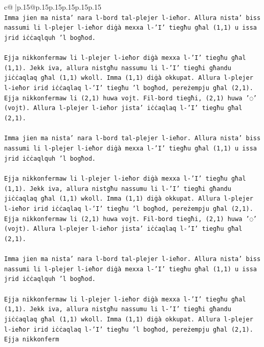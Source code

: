 \documentclass{article}
\begin{document}
{\begin{supertabular}{c@{$\;$}|p{.15\linewidth}@{}p{.15\linewidth}p{.15\linewidth}p{.15\linewidth}p{.15\linewidth}p{.15\linewidth}}
{{{\\ 
\texttt{Imma jien ma nista' nara l{-}bord tal{-}plejer l{-}ieħor. Allura nista' biss nassumi li l{-}plejer l{-}ieħor diġà mexxa l{-}'I' tiegħu għal (1,1) u issa jrid iċċaqlquh 'l bogħod.} \\
\\ 
\texttt{Ejja nikkonfermaw li l{-}plejer l{-}ieħor diġà mexxa l{-}'I' tiegħu għal (1,1). Jekk iva, allura nistgħu nassumu li l{-}'I' tiegħi għandu jiċċaqlaq għal (1,1) wkoll. Imma (1,1) diġà okkupat. Allura l{-}plejer l{-}ieħor irid iċċaqlaq l{-}'I' tiegħu 'l bogħod, pereżempju għal (2,1). Ejja nikkonfermaw li (2,1) huwa vojt. Fil{-}bord tiegħi, (2,1) huwa '◌' (vojt). Allura l{-}plejer l{-}ieħor jista' iċċaqlaq l{-}'I' tiegħu għal (2,1).} \\
\\ 
\texttt{Imma jien ma nista' nara l{-}bord tal{-}plejer l{-}ieħor. Allura nista' biss nassumi li l{-}plejer l{-}ieħor diġà mexxa l{-}'I' tiegħu għal (1,1) u issa jrid iċċaqlquh 'l bogħod.} \\
\\ 
\texttt{Ejja nikkonfermaw li l{-}plejer l{-}ieħor diġà mexxa l{-}'I' tiegħu għal (1,1). Jekk iva, allura nistgħu nassumu li l{-}'I' tiegħi għandu jiċċaqlaq għal (1,1) wkoll. Imma (1,1) diġà okkupat. Allura l{-}plejer l{-}ieħor irid iċċaqlaq l{-}'I' tiegħu 'l bogħod, pereżempju għal (2,1). Ejja nikkonfermaw li (2,1) huwa vojt. Fil{-}bord tiegħi, (2,1) huwa '◌' (vojt). Allura l{-}plejer l{-}ieħor jista' iċċaqlaq l{-}'I' tiegħu għal (2,1).} \\
\\ 
\texttt{Imma jien ma nista' nara l{-}bord tal{-}plejer l{-}ieħor. Allura nista' biss nassumi li l{-}plejer l{-}ieħor diġà mexxa l{-}'I' tiegħu għal (1,1) u issa jrid iċċaqlquh 'l bogħod.} \\
\\ 
\texttt{Ejja nikkonfermaw li l{-}plejer l{-}ieħor diġà mexxa l{-}'I' tiegħu għal (1,1). Jekk iva, allura nistgħu nassumu li l{-}'I' tiegħi għandu jiċċaqlaq għal (1,1) wkoll. Imma (1,1) diġà okkupat. Allura l{-}plejer l{-}ieħor irid iċċaqlaq l{-}'I' tiegħu 'l bogħod, pereżempju għal (2,1). Ejja nikkonferm} \\
            }
        }
    }
     \\ \\


\end{supertabular}}
\end{document}
